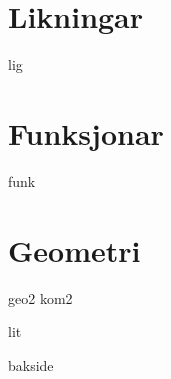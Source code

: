 \chapter{Likningar \label{Likningar}}
\newpage
{lig}

\chapter{Funksjonar \label{Funksjoner}}
{funk}

\chapter{Geometri}
\newpage
{geo2}
\newpage
{kom2}

{lit}
{\printindex {}
	}
{bakside}

















